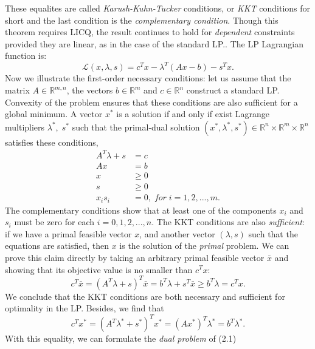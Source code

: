 \documentclass[a4paper,10 pt,titlepage,twoside]{book}
\theoremstyle{plain}
\theoremstyle{definition}
\theoremstyle{remark}
\begin{document}
These equalites are called \textit{Karush-Kuhn-Tucker} conditions, or \textit{KKT} conditions for short and the last condition is the \textit{complementary condition}. Though this theorem requires LICQ, the result continues to hold for \textit{dependent} constraints provided they are linear, as in the case of the standard LP.\cite{W}. The LP Lagrangian function is:\\
\begin{equation}
\mathcal{L}(x,\lambda,s)=c^{T}x-\lambda^{T}\left(Ax-b\right)-s^{T}x.
\end{equation}
Now we illustrate the first-order necessary conditions: let us assume that the matrix $A\in\mathbb{R}^{m,n}$, the vectors $b\in\mathbb{R}^{m}$ and $c\in\mathbb{R}^{n}$ construct a standard LP. Convexity of the problem ensures that these conditions are also sufficient for a global minimum.  A vector $x^{*}$ is a solution if and only if exist Lagrange multipliers $\lambda^{*},\;s^{*}$ such that the primal-dual solution $\left( x^{*},\lambda^{*},s^{*}\right)\in\mathbb{R}^{n}\times\mathbb{R}^{m}\times\mathbb{R}^{n}$ satisfies these conditions, 
\begin{align}
A^{T}\lambda+s&=c\\
Ax&=b\\
x&\geq 0\\
s&\geq 0\\
x_{i}s_{i}&=0,\; for\;i= 1,2,...,m.
\end{align} 
The complementary conditions show that at least one of the components $x_{i}$ and $s_{i}$ must be zero for each $i=0,1,2,...,n$. The KKT conditions are also \textit{sufficient}: if we have a primal feasible vector $x$, and another vector $(\lambda, s)$ such that the equations are satisfied, then $x$ is the solution of the \textit{primal} problem. We can prove this claim directly by taking an arbitrary primal feasible vector $\bar{x}$ and showing that its objective value is no smaller than $c^{T}x$:
\begin{equation*}
c^{T}\bar{x}=(A^{T}\lambda+s)^{T}\bar{x}=b^{T}\lambda+s^{T}\bar{x}\geq b^{T}\lambda= c^{T}x.
\end{equation*}
We conclude that the KKT conditions are both necessary and sufficient for optimality in the LP. Besides, we find that
\begin{equation*}
	c^{T}x^{*}=\left(A^{T}\lambda^{*}+s^{*}\right)^{T}x^{*}=\left(Ax^{*}\right)^{T}\lambda^{*}=b^{T}\lambda^{*}.
\end{equation*}
With this equality, we can formulate the \textit{dual problem} of (2.1)
\end{document}
